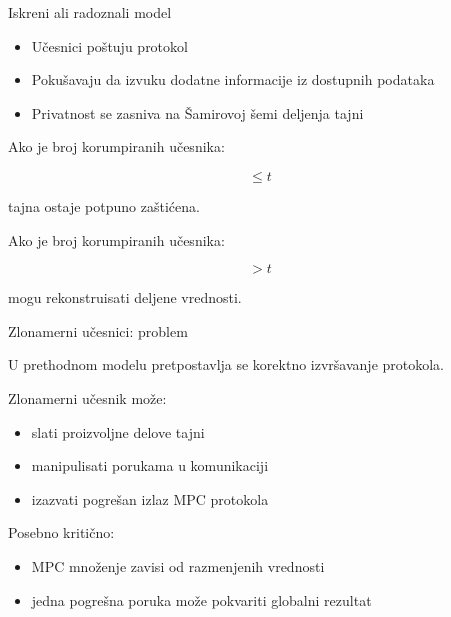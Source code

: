 \documentclass[aspectratio=1610]{beamer}
\begin{document}
\begin{frame}{Iskreni ali radoznali model}
\begin{itemize}
    \item Učesnici poštuju protokol
    \item Pokušavaju da izvuku dodatne informacije iz dostupnih podataka
    \item Privatnost se zasniva na Šamirovoj šemi deljenja tajni
\end{itemize}

Ako je broj korumpiranih učesnika:

\[
\le t
\]

tajna ostaje potpuno zaštićena.

Ako je broj korumpiranih učesnika:

\[
> t
\]

mogu rekonstruisati deljene vrednosti.

\end{frame}

\begin{frame}{Zlonamerni učesnici: problem}

U prethodnom modelu pretpostavlja se korektno izvršavanje protokola.

Zlonamerni učesnik može:

\begin{itemize}
    \item slati proizvoljne delove tajni
    \item manipulisati porukama u komunikaciji
    \item izazvati pogrešan izlaz MPC protokola
\end{itemize}

Posebno kritično:

\begin{itemize}
    \item MPC množenje zavisi od razmenjenih vrednosti
    \item jedna pogrešna poruka može pokvariti globalni rezultat
\end{itemize}

\end{frame}
\end{document}
